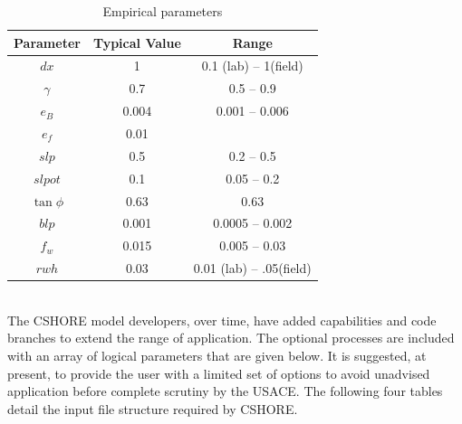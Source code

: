 \documentclass[11pt,oneside]{book}
\begin{document}
\begin{table}[h]
\begin{center}
\begin{tabular}{||c|c|c||}\hline
Parameter& Typical Value   & Range  \\ \hline \hline
$dx$ & 1 & 0.1 (lab) -- 1(field) \\ \hline
$\gamma$ & 0.7 & 0.5 -- 0.9 \\ \hline
$e_{B}$ & 0.004 & 0.001 -- 0.006 \\ \hline
$e_{f}$ & 0.01 &  \\ \hline
$slp$ & 0.5 & 0.2 -- 0.5 \\ \hline
$slpot$ & 0.1 & 0.05 -- 0.2 \\ \hline
$\tan \phi$ & 0.63 & 0.63 \\ \hline
$blp$ & 0.001 & 0.0005 -- 0.002 \\ \hline
$f_w$ & 0.015 & 0.005 -- 0.03 \\ \hline
$rwh$ & 0.03 & 0.01 (lab) -- .05(field) \\ \hline
\end{tabular}
\end{center}
\caption{Empirical  parameters}
\label{fig1}
\end{table}
\clearpage
{}\\ The CSHORE model developers,
over time, have added capabilities and code branches to extend the
range of application.  The optional processes are included with an
array of logical parameters that are given below.  It is suggested, at
present, to provide the user with a limited set of options to avoid
unadvised application before complete scrutiny by the USACE.  The
following four tables detail the input file structure required by
CSHORE.  
\end{document}
